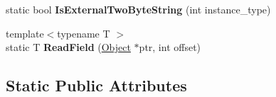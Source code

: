 \begin{DoxyCompactItemize}
\item 
\hypertarget{classv8_1_1internal_1_1_internals_a072f010fdf69ea2c0d7145190221410f}{}static bool {\bfseries Is\+External\+Two\+Byte\+String} (int instance\+\_\+type)\label{classv8_1_1internal_1_1_internals_a072f010fdf69ea2c0d7145190221410f}

\item 
\hypertarget{classv8_1_1internal_1_1_internals_a457c0c73d5fdf4cc577133edce0ce37b}{}{\footnotesize template$<$typename T $>$ }\\static T {\bfseries Read\+Field} (\hyperlink{classv8_1_1_object}{Object} $\ast$ptr, int offset)\label{classv8_1_1internal_1_1_internals_a457c0c73d5fdf4cc577133edce0ce37b}

\end{DoxyCompactItemize}
\subsection*{Static Public Attributes}
